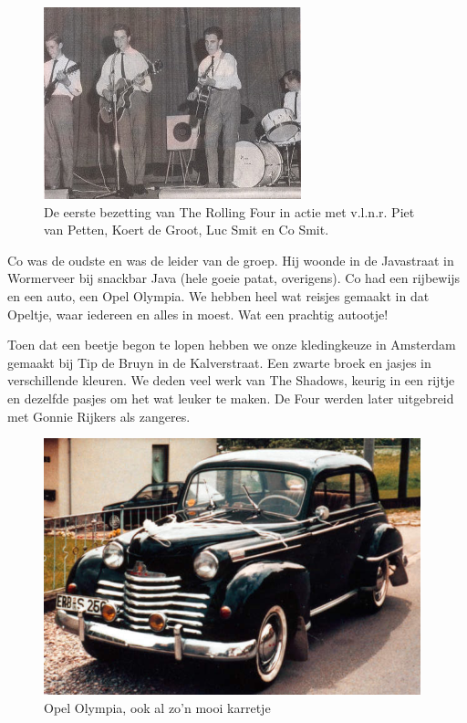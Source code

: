 \documentclass[10pt,twoside, openright]{memoir}
\begin{document}
\begin{figure}[t]
\includegraphics[width=\textwidth]{img/ch33/four}
\caption*{\footnotesize De eerste bezetting van The Rolling Four in actie met v.l.n.r. Piet van Petten, Koert de Groot, Luc Smit en Co Smit.}
\end{figure}

Co was de oudste en was de leider van de groep. Hij woonde in de Javastraat in Wormerveer bij snackbar Java (hele goeie patat, overigens). Co had een rijbewijs en een auto, een Opel Olympia. We hebben heel wat reisjes gemaakt in dat Opeltje, waar iedereen en alles in moest. Wat een prachtig autootje!

Toen dat een beetje begon te lopen hebben we onze kledingkeuze in Amsterdam gemaakt bij Tip de Bruyn in de Kalverstraat. Een zwarte broek en jasjes in verschillende kleuren. We deden veel werk van The Shadows, keurig in een rijtje en dezelfde pasjes om het wat leuker te maken. De Four werden later uitgebreid met Gonnie Rijkers als zangeres. 

\begin{figure}
\includegraphics[width=\textwidth]{img/ch26/opel_olympia_big}
\caption*{\footnotesize Opel Olympia, ook al zo'n mooi karretje}
\end{figure}
\end{document}
